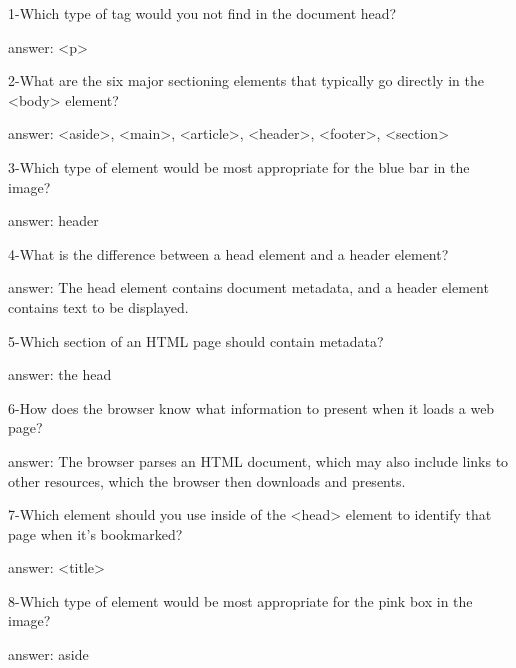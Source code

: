 1-Which type of tag would you not find in the document head?

answer: <p>

2-What are the six major sectioning elements that typically go directly in the <body> element?

answer: <aside>, <main>, <article>, <header>, <footer>, <section>

3-Which type of element would be most appropriate for the blue bar in the image? 

answer: header

4-What is the difference between a head element and a header element?

answer: The head element contains document metadata, and a header element contains text to be displayed.

5-Which section of an HTML page should contain metadata?

answer: the head

6-How does the browser know what information to present when it loads a web page?

answer: The browser parses an HTML document, which may also include links to other resources, which the browser then downloads and presents.

7-Which element should you use inside of the <head> element to identify that page when it's bookmarked?

answer: <title>

8-Which type of element would be most appropriate for the pink box in the image? 

answer: aside